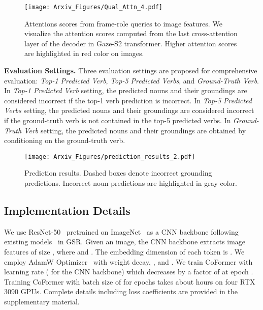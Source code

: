 \begin{figure*}[t!]
    \centering
    \texttt{[image: Arxiv\_Figures/Qual\_Attn\_4.pdf]}
    \caption{
    Attentions scores from \mbox{frame-role} queries to image features.
    We visualize the attention scores computed from the last cross-attention layer of the decoder in \mbox{Gaze-S2} transformer.
    Higher attention scores are highlighted in red color on images.
    }
    \label{fig:qual_role_attn}
\end{figure*}

\noindent \textbf{Evaluation Settings.} 
Three evaluation settings are proposed for comprehensive evaluation: \textit{\mbox{Top-1} Predicted Verb}, \textit{\mbox{Top-5} Predicted Verbs}, and \textit{\mbox{Ground-Truth} Verb}.
In \textit{\mbox{Top-1} Predicted Verb} setting, the predicted nouns and their groundings are considered incorrect if the \mbox{top-1} verb prediction is incorrect.
In \textit{\mbox{Top-5} Predicted Verbs} setting, the predicted nouns and their groundings are considered incorrect if the \mbox{ground-truth} verb is not contained in the \mbox{top-5} predicted verbs.
In \textit{\mbox{Ground-Truth} Verb} setting, the predicted nouns and their groundings are obtained by conditioning on the \mbox{ground-truth} verb.
\begin{figure*}[t!]
    \centering
    \texttt{[image: Arxiv\_Figures/prediction\_results\_2.pdf]}
    \caption{
    Prediction results.
    Dashed boxes denote incorrect grounding predictions.
    Incorrect noun predictions are highlighted in gray color.
    }
    \vspace{-2mm}
    \label{fig:qual_pred}
\end{figure*}

\subsection{Implementation Details}
We use \mbox{ResNet-50}~\cite{resnet} pretrained on ImageNet~\cite{deng2009imagenet} as a CNN backbone following existing models~\cite{pratt2020grounded,cho2021gsrtr} in GSR.
Given an image, the CNN backbone extracts image features of size , where  and .
The embedding dimension of each token is .
We employ AdamW Optimizer~\cite{loshchilov2018decoupled} with  weight decay, , and .
We train \mbox{CoFormer} with  learning rate ( for the CNN backbone) which decreases by a factor of  at epoch .
Training \mbox{CoFormer} with batch size of  for  epochs takes about  hours on four RTX 3090 GPUs.
Complete details including loss coefficients are provided in the supplementary material.

